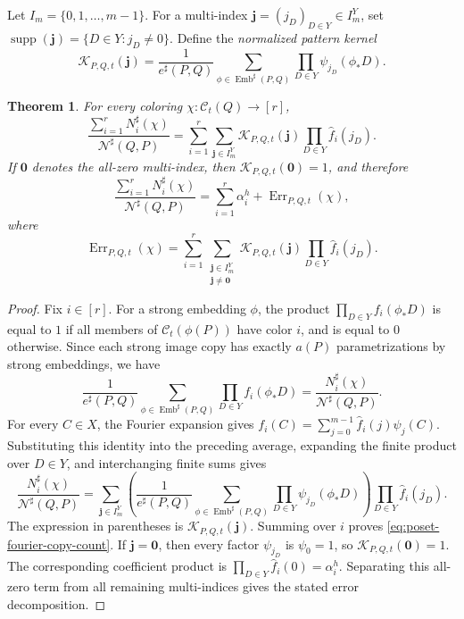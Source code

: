 \documentclass[twoside,12pt]{article}
\newtheorem{theorem}{Theorem}[section]
\begin{document}
Let \(I_m=\{0,1,\ldots,m-1\}\). For a multi-index
\(\mathbf j=(j_D)_{D\in Y}\in I_m^Y\), set
\(\operatorname{supp}(\mathbf j)=\{D\in Y:j_D\ne0\}\). Define the \textit{normalized pattern kernel}
$$ \mathcal K_{P,Q,t}(\mathbf j)
 =
 \frac1{e^\sharp(P,Q)}
\sum_{\phi\in\operatorname{Emb}^{\sharp}(P,Q)}
 \prod_{D\in Y}\psi_{j_D}(\phi_*D).$$



\begin{theorem}
\label{thm:poset-fourier-expansion}
For every coloring \(\chi:\mathcal C_t(Q)\to[r]\),
\begin{equation}\label{eq:poset-fourier-copy-count}
 \frac{\sum_{i=1}^rN_i^\sharp(\chi)}{\mathcal N^\sharp(Q,P)}
 =
 \sum_{i=1}^r\sum_{\mathbf j\in I_m^Y}
 \mathcal K_{P,Q,t}(\mathbf j)
 \prod_{D\in Y}\widehat f_i(j_D).
\end{equation}
If \(\mathbf0\) denotes the all-zero multi-index, then
\(\mathcal K_{P,Q,t}(\mathbf0)=1\), and therefore
\[
 \frac{\sum_{i=1}^rN_i^\sharp(\chi)}{\mathcal N^\sharp(Q,P)}
 =
 \sum_{i=1}^r\alpha_i^h
 +
 \operatorname{Err}_{P,Q,t}(\chi),
\]
where
\[
 \operatorname{Err}_{P,Q,t}(\chi)
 =
 \sum_{i=1}^r
 \sum_{\substack{\mathbf j\in I_m^Y\\ \mathbf j\ne\mathbf0}}
 \mathcal K_{P,Q,t}(\mathbf j)
 \prod_{D\in Y}\widehat f_i(j_D).
\]
\end{theorem}

\begin{proof}
Fix \(i\in[r]\). For a strong embedding \(\phi\), the product
\(\prod_{D\in Y}f_i(\phi_*D)\) is equal to \(1\) if all members of
\(\mathcal C_t(\phi(P))\) have color \(i\), and is equal to \(0\) otherwise.
Since each strong image copy has exactly \(a(P)\) parametrizations by
strong embeddings, we have
\[
 \frac1{e^\sharp(P,Q)}
 \sum_{\phi\in\operatorname{Emb}^{\sharp}(P,Q)}
 \prod_{D\in Y}f_i(\phi_*D)
 =
 \frac{N_i^\sharp(\chi)}{\mathcal N^\sharp(Q,P)}.
\]
For every \(C\in X\), the Fourier expansion gives
\(f_i(C)=\sum_{j=0}^{m-1}\widehat f_i(j)\psi_j(C)\). Substituting this
identity into the preceding average, expanding the finite product over
\(D\in Y\), and interchanging finite sums gives
\[
 \frac{N_i^\sharp(\chi)}{\mathcal N^\sharp(Q,P)}
 =
 \sum_{\mathbf j\in I_m^Y}
 \left(
 \frac1{e^\sharp(P,Q)}
 \sum_{\phi\in\operatorname{Emb}^{\sharp}(P,Q)}
 \prod_{D\in Y}\psi_{j_D}(\phi_*D)
 \right)
 \prod_{D\in Y}\widehat f_i(j_D).
\]
The expression in parentheses is \(\mathcal K_{P,Q,t}(\mathbf j)\). Summing
over \(i\) proves \eqref{eq:poset-fourier-copy-count}. If
\(\mathbf j=\mathbf0\), then every factor \(\psi_{j_D}\) is \(\psi_0=1\),
so \(\mathcal K_{P,Q,t}(\mathbf0)=1\). The corresponding coefficient
product is \(\prod_{D\in Y}\widehat f_i(0)=\alpha_i^h\). Separating this
all-zero term from all remaining multi-indices gives the stated error
decomposition.
\end{proof}
\end{document}
